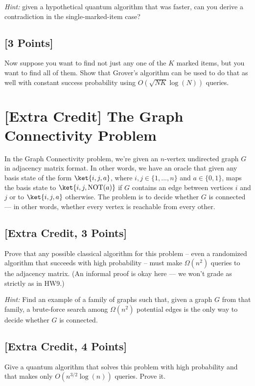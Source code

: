 \documentclass[11pt]{article}
\begin{document}
\noindent \emph{Hint:} given a hypothetical quantum algorithm that was faster, can you derive a contradiction in the single-marked-item case?


\subsection{[3 Points]} Now suppose you want to find not just any one of the $K$ marked items, but you want to find all of them.  Show that Grover's algorithm can be used to do that as well with constant success probability using $O({\sqrt{NK} \log{(N)}})$ queries.



\section{[Extra Credit] The Graph Connectivity Problem}

In the Graph Connectivity problem, we're given an $n$-vertex undirected graph $G$ in adjacency matrix format.  In other words, we have an oracle that given any basis state of the form $\ket{i,j,a}$, where $i,j \in \{1,...,n\}$ and $a \in \{0,1\}$, maps the basis state to $\ket{i,j,\text{NOT}(a)}$ if $G$ contains an edge between vertices $i$ and $j$ or to $\ket{i,j,a}$ otherwise.  The problem is to decide whether $G$ is connected --- in other words, whether every vertex is reachable from every other.

\subsection{[Extra Credit, 3 Points]} Prove that any possible classical algorithm for this problem -- even a randomized algorithm that succeeds with high probability -- must make $\Omega(n^2)$ queries to the adjacency matrix.
(An informal proof is okay here --- we won't grade as strictly as in HW9.)

\noindent \textit{Hint:} Find an example of a family of graphs such that, given a graph $G$ from that family, a brute-force search among $\Omega(n^2)$ potential edges is the only way to decide whether $G$ is connected.


\subsection{[Extra Credit, 4 Points]} Give a quantum algorithm that solves this problem with high probability and that makes only $O(n^{3/2} \log{(n)})$ queries. Prove it.
\end{document}
